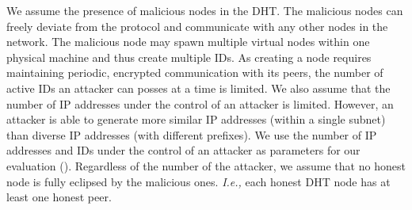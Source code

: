 We assume the presence of malicious nodes in the DHT. The malicious nodes can freely deviate from the protocol and communicate with any other nodes in the network. The malicious node may spawn multiple virtual nodes within one physical machine and thus create multiple IDs. As creating a node requires maintaining periodic, encrypted communication with its peers, the number of active IDs an attacker can posses at a time is limited. We also assume that the number of IP addresses under the control of an attacker is limited. However, an attacker is able to generate more similar IP addresses (within a single subnet) than diverse IP addresses (with different prefixes). We use the number of IP addresses and IDs under the control of an attacker as parameters for our evaluation (). Regardless of the number of the attacker, we assume that no honest node is fully eclipsed by the malicious ones. \textit{I.e.,} each honest DHT node has at least one honest peer. 
